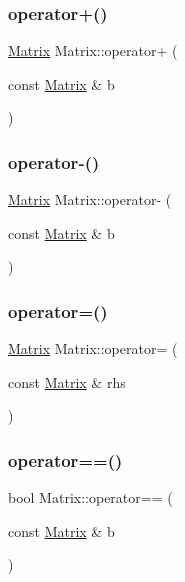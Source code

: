 \subsubsection{\texorpdfstring{operator+()}{operator+()}}
{\footnotesize\ttfamily \mbox{\hyperlink{class_matrix}{Matrix}} Matrix\+::operator+ (\begin{DoxyParamCaption}\item[{const \mbox{\hyperlink{class_matrix}{Matrix}} \&}]{b }\end{DoxyParamCaption})}

\mbox{\label{class_matrix_ae9f9af2349c3f6520a75116ceba73a77}} 
\subsubsection{\texorpdfstring{operator-\/()}{operator-()}}
{\footnotesize\ttfamily \mbox{\hyperlink{class_matrix}{Matrix}} Matrix\+::operator-\/ (\begin{DoxyParamCaption}\item[{const \mbox{\hyperlink{class_matrix}{Matrix}} \&}]{b }\end{DoxyParamCaption})}

\mbox{\label{class_matrix_a0355fb02a7719e9b81938702eae3abe2}} 
\subsubsection{\texorpdfstring{operator=()}{operator=()}}
{\footnotesize\ttfamily \mbox{\hyperlink{class_matrix}{Matrix}} Matrix\+::operator= (\begin{DoxyParamCaption}\item[{const \mbox{\hyperlink{class_matrix}{Matrix}} \&}]{rhs }\end{DoxyParamCaption})}

\mbox{\label{class_matrix_a9094eaa5bbb1bdf4fb1811dfd163effb}} 
\subsubsection{\texorpdfstring{operator==()}{operator==()}}
{\footnotesize\ttfamily bool Matrix\+::operator== (\begin{DoxyParamCaption}\item[{const \mbox{\hyperlink{class_matrix}{Matrix}} \&}]{b }\end{DoxyParamCaption})}

